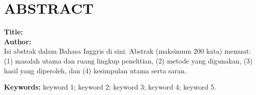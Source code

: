 %
%

\chapter*{ABSTRACT}

\noindent\textbf{Title:} \ThesisTitleEN\\
\textbf{Author:} \AuthorName\\[0.75\baselineskip]


{Isi abstrak dalam Bahasa Inggris di sini. Abstrak (maksimum 200 kata) memuat: (1) masalah utama dan ruang lingkup penelitian, (2) metode yang digunakan, (3) hasil yang diperoleh, dan (4) kesimpulan utama serta saran.}


\textbf{Keywords:} {keyword 1}; {keyword 2}; {keyword 3}; {keyword 4}; {keyword 5}.
